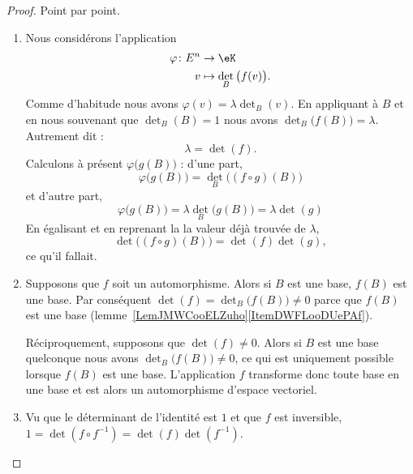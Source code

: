 \begin{proof}
	Point par point.
	\begin{enumerate}
		\item
		      Nous considérons l'application
		      \begin{equation}
			      \begin{aligned}
				      \varphi\colon E^n & \to \eK                         \\
				      v                 & \mapsto \det_B\big( f(v) \big).
			      \end{aligned}
		      \end{equation}
		      Comme d'habitude nous avons \( \varphi(v)=\lambda\det_B(v)\). En appliquant à \( B\) et en nous souvenant que \( \det_B(B)=1\) nous avons
		      \( \det_B\big( f(B) \big)=\lambda\). Autrement dit :
		      \begin{equation}
			      \lambda=\det(f).
		      \end{equation}
		      Calculons à présent \( \varphi\big( g(B) \big)\) : d'une part,
		      \begin{equation}
			      \varphi\big( g(B) \big)=\det_B\big( (f\circ g)(B) \big)
		      \end{equation}
		      et d'autre part,
		      \begin{equation}
			      \varphi\big( g(B) \big)=\lambda\det_B\big( g(B) \big)=\lambda\det(g)
		      \end{equation}
		      En égalisant et en reprenant la la valeur déjà trouvée de \( \lambda\),
		      \begin{equation}
			      \det\big((f\circ g)(B) \big)=\det(f)\det(g),
		      \end{equation}
		      ce qu'il fallait.
		\item
		      Supposons que \( f\) soit un automorphisme. Alors si \( B\) est une base, \( f(B) \) est une base. Par conséquent \( \det(f)=\det_B\big( f(B) \big)\neq 0\) parce que \( f(B)\) est une base (lemme~\ref{LemJMWCooELZuho}\ref{ItemDWFLooDUePAf}).

		      Réciproquement, supposons que \( \det(f)\neq 0\). Alors si \( B\) est une base quelconque nous avons \( \det_B\big( f(B) \big)\neq 0\), ce qui est uniquement possible lorsque \( f(B)\) est une base. L'application \( f\) transforme donc toute base en une base et est alors un automorphisme d'espace vectoriel.
		\item
		      Vu que le déterminant de l'identité est \( 1\) et que \( f\) est inversible, \( 1=\det(f\circ f^{-1})=\det(f)\det(f^{-1})\).
	\end{enumerate}
\end{proof}

